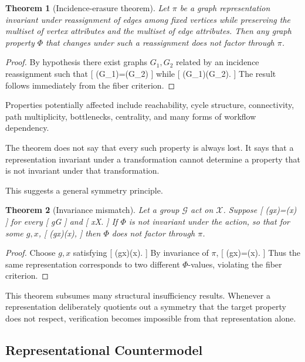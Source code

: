 \documentclass[11pt]{article}
\newtheorem{theorem}{Theorem} \newtheorem{proposition}{Proposition} \newtheorem{lemma}{Lemma} \newtheorem{corollary}{Corollary} \newtheorem{definition}{Definition} \newtheorem{remark}{Remark}
\begin{document}
\begin{theorem}[Incidence-erasure theorem]
Let $\pi$ be a graph representation invariant under reassignment of edges among fixed vertices while preserving the multiset of vertex attributes and the multiset of edge attributes. Then any graph property $\Phi$ that changes under such a reassignment does not factor through $\pi$.
\end{theorem}

\begin{proof}
By hypothesis there exist graphs $G_1,G_2$ related by an incidence reassignment such that
[
\pi(G_1)=\pi(G_2)
]
while
[
\Phi(G_1)\neq\Phi(G_2).
]
The result follows immediately from the fiber criterion.
\end{proof}

Properties potentially affected include reachability, cycle structure, connectivity, path multiplicity, bottlenecks, centrality, and many forms of workflow dependency.

The theorem does not say that every such property is always lost. It says that a representation invariant under a transformation cannot determine a property that is not invariant under that transformation.

This suggests a general symmetry principle.

\begin{theorem}[Invariance mismatch]
Let a group $\mathcal G$ act on $\mathcal X$. Suppose
[
\pi(gx)=\pi(x)
]
for every
[
g\in\mathcal G
]
and
[
x\in\mathcal X.
]
If $\Phi$ is not invariant under the action, so that for some $g,x$,
[
\Phi(gx)\neq\Phi(x),
]
then $\Phi$ does not factor through $\pi$.
\end{theorem}

\begin{proof}
Choose $g,x$ satisfying
[
\Phi(gx)\neq\Phi(x).
]
By invariance of $\pi$,
[
\pi(gx)=\pi(x).
]
Thus the same representation corresponds to two different $\Phi$-values, violating the fiber criterion.
\end{proof}

This theorem subsumes many structural insufficiency results. Whenever a representation deliberately quotients out a symmetry that the target property does not respect, verification becomes impossible from that representation alone.

\subsection{Representational Countermodel}
\end{document}
